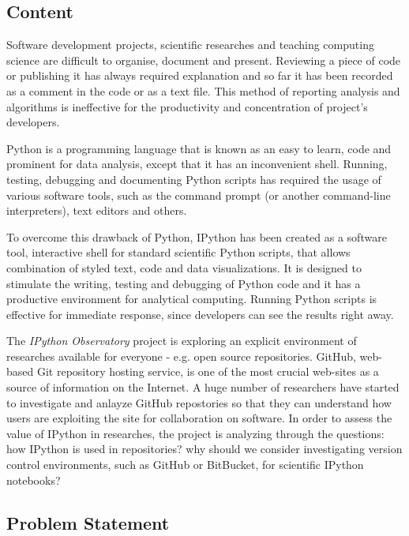 \subsection{Content}

Software development projects, scientific researches and teaching computing science are difficult to organise, document and present. Reviewing a piece of code or publishing it has always required explanation and so far it has been recorded as a comment in the code or as a text file. This method of reporting analysis and algorithms is ineffective for the productivity and concentration of project's developers. 

Python is a programming language that is known as an easy to learn, code and prominent for data analysis, except that it has an inconvenient shell. Running, testing, debugging and documenting Python scripts has required the usage of various software tools, such as the command prompt (or another command-line interpreters), text editors and others. 

To overcome this drawback of Python, IPython has been created as a software tool, interactive shell for standard scientific Python scripts, that allows combination of styled text, code and data visualizations. It is designed to stimulate the writing, testing and debugging of Python code and it has a productive environment for analytical computing. \cite{mckinney2012python} Running Python scripts is effective for immediate response, since developers can see the results right away.

The \textit{IPython Observatory} project is exploring an explicit environment of researches available for everyone - e.g. open source repositories. GitHub,  web-based Git repository hosting service, is one of the most crucial web-sites as a source of information  on the Internet.\cite{gitHubWiki} A huge number of researchers have started to investigate and anlayze GitHub repostories so that they can understand how users are exploiting the site for collaboration on software. \cite{kalliamvakou2007promises} In order to assess the value of IPython in researches, the project is analyzing through the questions: how IPython is used in repositories? why should we consider investigating version control environments, such as GitHub or BitBucket, for scientific IPython notebooks? 

\subsection{Problem Statement}
\label{subsec:problem}

